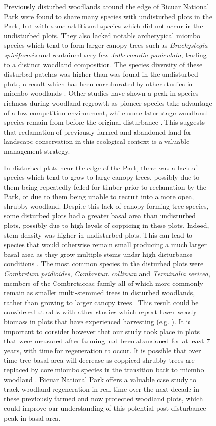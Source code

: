 \documentclass[diversity,article,submit,moreauthors,pdftex]{Definitions/mdpi}
\begin{document}
\begin{figure}[H]
Previously disturbed woodlands around the edge of Bicuar National Park were found to share many species with undisturbed plots in the Park, but with some additional species which did not occur in the undisturbed plots. They also lacked notable archetypical miombo species which tend to form larger canopy trees such as \textit{Brachystegia spiciformis} and contained very few \textit{Julbernardia paniculata}, leading to a distinct woodland composition. The species diversity of these disturbed patches was higher than was found in the undisturbed plots, a result which has been corroborated by other studies in miombo woodlands \citep{Caro2001, McNicol2018b, Shackleton2000}. Other studies have shown a peak in species richness during woodland regrowth as pioneer species take advantage of a low competition environment, while some later stage woodland species remain from before the original disturbance \citep{Goncalves2017, Kalaba2013}. This suggests that reclamation of previously farmed and abandoned land for landscape conservation in this ecological context is a valuable management strategy.

In disturbed plots near the edge of the Park, there was a lack of species which tend to grow to large canopy trees, possibly due to them being repeatedly felled for timber prior to reclamation by the Park, or due to them being unable to recruit into a more open, shrubby woodland. Despite this lack of canopy forming tree species, some disturbed plots had a greater basal area than undisturbed plots, possibly due to high levels of coppicing in these plots. Indeed, stem density was higher in undisturbed plots. This can lead to species that would otherwise remain small producing a much larger basal area as they grow multiple stems under high disturbance conditions \citep{Luoga2004}. The most common species in the disturbed plots were \textit{Combretum psidioides}, \textit{Combretum collinum} and \textit{Terminalia sericea}, members of the Combretaceae family all of which more commonly remain as smaller multi-stemmed trees in disturbed woodlands, rather than growing to larger canopy trees \citep{Wyk2014}. This result could be considered at odds with other studies which report lower woody biomass in plots that have experienced harvesting (e.g. \citealt{Muvengwi2020}). It is important to consider however that our study took place in plots that were measured after farming had been abandoned for at least 7 years, with time for regeneration to occur. It is possible that over time tree basal area will decrease as coppiced shrubby trees are replaced by core miombo species in the transition back to miombo woodland \citep{Goncalves2017}. Bicuar National Park offers a valuable case study to track woodland regeneration in real-time over the next decade in these previously farmed and now protected woodland plots, which could improve our understanding of this potential post-disturbance peak in basal area.


\end{figure}
\end{document}
